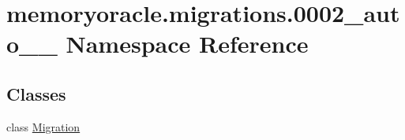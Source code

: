 \hypertarget{namespacememoryoracle_1_1migrations_1_10002__auto__20150303__0042}{}\section{memoryoracle.\+migrations.0002\+\_\+auto\+\_\+\_ Namespace Reference}
\label{namespacememoryoracle_1_1migrations_1_10002__auto__20150303__0042}
\subsection*{Classes}
\begin{DoxyCompactItemize}
\item 
class \hyperlink{classmemoryoracle_1_1migrations_1_10002__auto__20150303__0042_1_1Migration}{Migration}
\end{DoxyCompactItemize}
